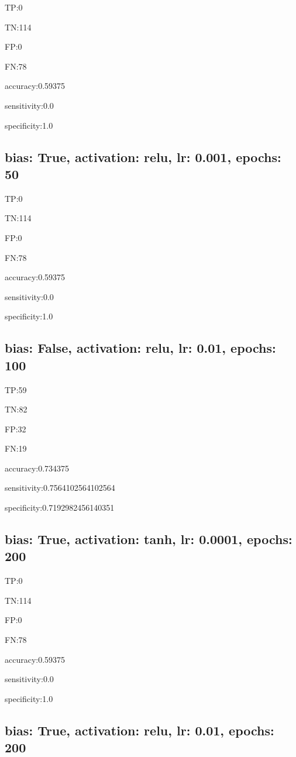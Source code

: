 \documentclass{article}
\begin{document}
TP:0

TN:114

FP:0

FN:78

accuracy:0.59375

sensitivity:0.0

specificity:1.0



\subsection{bias: True, activation: relu, lr: 0.001, epochs: 50}

TP:0

TN:114

FP:0

FN:78

accuracy:0.59375

sensitivity:0.0

specificity:1.0



\subsection{bias: False, activation: relu, lr: 0.01, epochs: 100}

TP:59

TN:82

FP:32

FN:19

accuracy:0.734375

sensitivity:0.7564102564102564

specificity:0.7192982456140351



\subsection{bias: True, activation: tanh, lr: 0.0001, epochs: 200}

TP:0

TN:114

FP:0

FN:78

accuracy:0.59375

sensitivity:0.0

specificity:1.0



\subsection{bias: True, activation: relu, lr: 0.01, epochs: 200}
\end{document}
